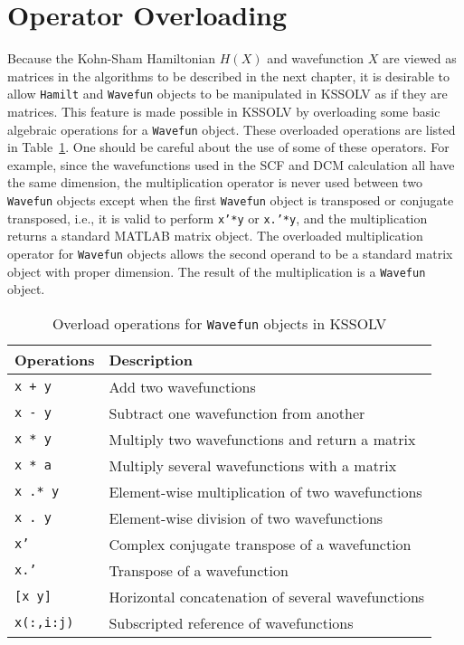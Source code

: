 \documentclass[11pt]{book}
\begin{document}
\section{Operator Overloading}
Because the Kohn-Sham Hamiltonian $H(X)$ and wavefunction $X$ are viewed
as matrices in the algorithms to be described in the next chapter, 
it is desirable to allow {\tt Hamilt} and {\tt Wavefun} objects to be 
manipulated in KSSOLV as if they are matrices.  This feature is made possible
in KSSOLV by overloading some basic algebraic operations for
a {\tt Wavefun} object. These overloaded operations are listed in 
Table~\ref{wvops}.  One should be careful about the use of 
some of these operators. For example, since the wavefunctions used in the SCF
and DCM calculation all have the same dimension, the multiplication
operator {\tt *} is never used between two {\tt Wavefun}
objects except when the first {\tt Wavefun} object is transposed
or conjugate transposed, i.e., it is valid to perform {\tt x'*y}
or {\tt x.'*y}, and the multiplication returns a standard MATLAB
matrix object.  The overloaded multiplication operator {\tt *} for 
{\tt Wavefun} objects allows the second operand to be a standard matrix 
object with proper dimension. The result of the multiplication is a 
{\tt Wavefun} object.
%
\begin{table}[htbp]
\center
\begin{tabular}{|l|l|} \hline
Operations     &  Description \\ \hline
{\tt x + y}    & Add two wavefunctions \\
{\tt x - y}    & Subtract one wavefunction from another \\
{\tt x * y}    & Multiply two wavefunctions and return a matrix\\
{\tt x * a}    & Multiply several wavefunctions with a matrix\\
{\tt x .* y}   & Element-wise multiplication of two wavefunctions\\
{\tt x .\ y}   & Element-wise division of two wavefunctions\\
{\tt x'}       & Complex conjugate transpose of a wavefunction\\
{\tt x.'}      & Transpose of a wavefunction\\
{\tt [x y]}    & Horizontal concatenation of several wavefunctions\\
{\tt x(:,i:j)} & Subscripted reference of wavefunctions\\
\hline
\end{tabular}
\caption{Overload operations for {\tt Wavefun} objects in KSSOLV}
\label{wvops}
\end{table}
\end{document}
